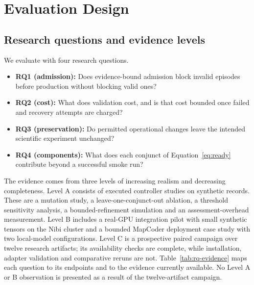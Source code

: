 \section{Evaluation Design}\label{sec:evaluation}
\subsection{Research questions and evidence levels}\label{sec:rqs}
We evaluate \tool{} with four research questions.
\begin{itemize}
\item \textbf{RQ1 (admission):} Does evidence-bound admission block invalid episodes before production without blocking valid ones?
\item \textbf{RQ2 (cost):} What does validation cost, and is that cost bounded once failed and recovery attempts are charged?
\item \textbf{RQ3 (preservation):} Do permitted operational changes leave the intended scientific experiment unchanged?
\item \textbf{RQ4 (components):} What does each conjunct of Equation~\eqref{eq:ready} contribute beyond a successful smoke run?
\end{itemize}

The evidence comes from three levels of increasing realism and decreasing completeness. Level A consists of executed controller studies on synthetic records. These are a mutation study, a leave-one-conjunct-out ablation, a threshold sensitivity analysis, a bounded-refinement simulation and an assessment-overhead measurement. Level B includes a real-GPU integration pilot with small synthetic tensors on the Nibi cluster and a bounded MapCoder deployment case study with two local-model configurations. Level C is a prospective paired campaign over twelve research artifacts; its availability checks are complete, while installation, adapter validation and comparative reruns are not. Table~\ref{tab:rq-evidence} maps each question to its endpoints and to the evidence currently available. No Level A or B observation is presented as a result of the twelve-artifact campaign.

